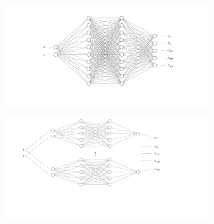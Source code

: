 \documentclass[aspectratio=1610, 10pt]{beamer}
\begin{document}
\begin{frame}
\begin{columns}
\begin{column}{0.33\textwidth}
        \begin{figure}
        \centering
        \includegraphics[trim={8cm 2cm 8cm 2.5cm},clip,width = 0.98\linewidth]{Figures/PINN_arch1.pdf}    
        \end{figure}
        \begin{figure}
        \centering
        \includegraphics[trim={4cm 2cm 11cm 0cm},clip,width = 0.98\linewidth]{Figures/PINN_arch2.pdf}    
        \end{figure}

    \end{column}
    \end{columns}   
 \end{frame}
\end{document}
